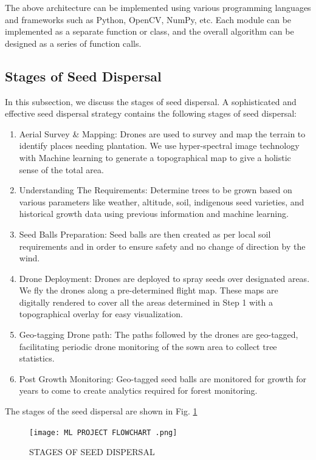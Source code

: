 \documentclass[conference]{IEEEtran}
\begin{document}
The above architecture can be implemented using various programming languages and frameworks such as Python, OpenCV, NumPy, etc. Each module can be implemented as a separate function or class, and the overall algorithm can be designed as a series of function calls.

\subsection{Stages of Seed Dispersal}
In this subsection, we discuss the stages of seed dispersal. A sophisticated and effective seed dispersal strategy contains the following stages of seed dispersal:
\begin{enumerate}
\item Aerial Survey \& Mapping: Drones are used to survey and map the terrain to identify places needing plantation. We use hyper-spectral image technology with Machine learning to generate a topographical map to give a holistic sense of the total area.

\item  Understanding The Requirements: Determine trees to be grown based on various parameters like weather, altitude, soil, indigenous seed varieties, and historical growth data using previous information and machine learning.

\item  Seed Balls Preparation: Seed balls are then created as per local soil requirements and in order to ensure safety and no change of direction by the wind.

\item Drone Deployment: Drones are deployed to spray seeds over designated areas. We fly the drones along a pre-determined flight map. These maps are digitally rendered to cover all the areas determined in Step 1 with a topographical overlay for easy visualization.

\item Geo-tagging Drone path: The paths followed by the drones are geo-tagged, facilitating periodic drone monitoring of the sown area to collect tree statistics.

\item Post Growth Monitoring: Geo-tagged seed balls are monitored for growth for years to come to create analytics required for forest monitoring.
\end{enumerate}

The stages of the seed dispersal are shown in Fig. \ref{sd}
\begin{figure}[htp]
    \centering
    \texttt{[image: ML PROJECT FLOWCHART .png]}
    \caption{STAGES OF SEED DISPERSAL}
    \label{sd}
\end{figure}
\end{document}
